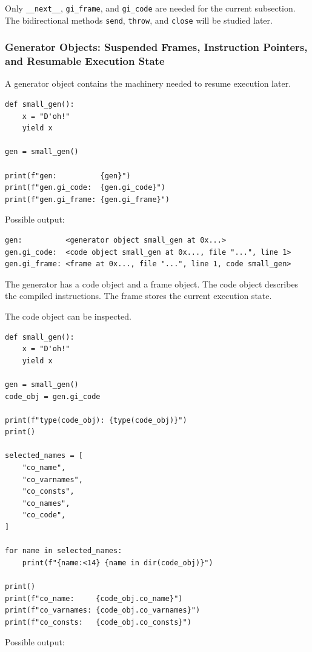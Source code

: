 Only \texttt{\_\_next\_\_}, \texttt{gi\_frame}, and \texttt{gi\_code} are needed for the current subsection. The bidirectional methods \texttt{send}, \texttt{throw}, and \texttt{close} will be studied later.

\subsubsection{Generator Objects: Suspended Frames, Instruction Pointers, and Resumable Execution State}

A generator object contains the machinery needed to resume execution later.

\begin{verbatim}
def small_gen():
    x = "D'oh!"
    yield x

gen = small_gen()

print(f"gen:          {gen}")
print(f"gen.gi_code:  {gen.gi_code}")
print(f"gen.gi_frame: {gen.gi_frame}")
\end{verbatim}

Possible output:

\begin{verbatim}
gen:          <generator object small_gen at 0x...>
gen.gi_code:  <code object small_gen at 0x..., file "...", line 1>
gen.gi_frame: <frame at 0x..., file "...", line 1, code small_gen>
\end{verbatim}

The generator has a code object and a frame object. The code object describes the compiled instructions. The frame stores the current execution state.

The code object can be inspected.

\begin{verbatim}
def small_gen():
    x = "D'oh!"
    yield x

gen = small_gen()
code_obj = gen.gi_code

print(f"type(code_obj): {type(code_obj)}")
print()

selected_names = [
    "co_name",
    "co_varnames",
    "co_consts",
    "co_names",
    "co_code",
]

for name in selected_names:
    print(f"{name:<14} {name in dir(code_obj)}")

print()
print(f"co_name:     {code_obj.co_name}")
print(f"co_varnames: {code_obj.co_varnames}")
print(f"co_consts:   {code_obj.co_consts}")
\end{verbatim}

Possible output:

